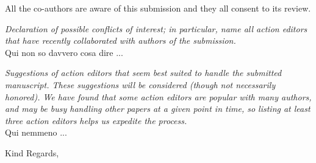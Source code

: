 \documentclass[11pt]{letter} %
\begin{document}
\begin{letter}
All the co-authors are aware of this submission and they all consent to its review.

\emph{Declaration of possible conflicts of interest; in particular, name all action editors that have recently collaborated with authors of the submission.}\\
Qui non so davvero cosa dire ...

\emph{Suggestions of action editors that seem best suited to handle the submitted manuscript. These suggestions will be considered (though not necessarily honored). We have found that some action editors are popular with many authors, and may be busy handling other papers at a given point in time, so listing at least three action editors helps us expedite the process.}\\
Qui nemmeno ...


\closing{Kind Regards,}




\end{letter}
\end{document}
